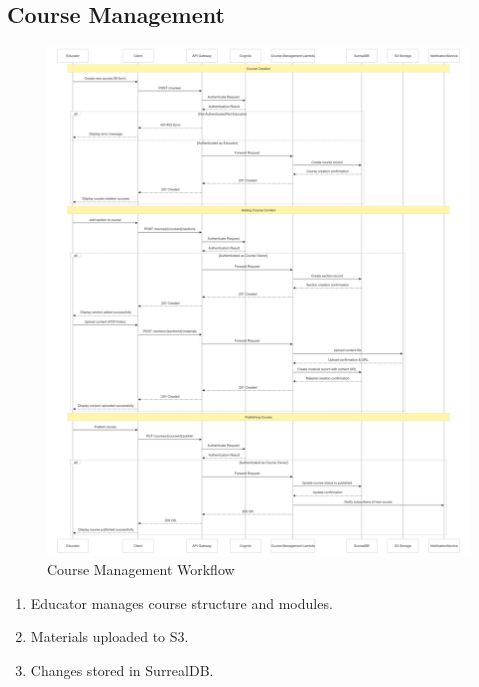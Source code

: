 \documentclass[a4paper, 11pt]{scrreprt}
\begin{document}
\subsection{Course Management}
\begin{figure}[!htb]
    \centering
    \includegraphics[height=0.75\textheight]{educator_managing_courses.png}
    \caption{Course Management Workflow}
\end{figure}
\begin{enumerate}
    \item Educator manages course structure and modules.
    \item Materials uploaded to S3.
    \item Changes stored in SurrealDB.
\end{enumerate}
\end{document}
